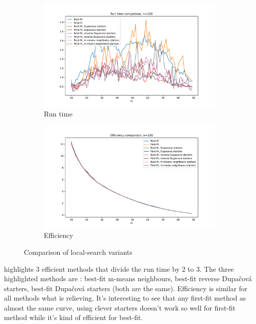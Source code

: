 \documentclass{amsart}
\begin{document}
\begin{figure}[ht]
    \centering
    \begin{subfigure}[b]{0.495\textwidth}
        \centering
        \includegraphics[width=1.1\textwidth]{plots/run time methods.pdf}
        \caption{Run time}
    \end{subfigure}
    \hfill
    \begin{subfigure}[b]{0.495\textwidth}
        \centering
        \includegraphics[width=1.1\textwidth]{plots/value methods.pdf}
        \caption{Efficiency}
    \end{subfigure}
    \caption{Comparison of local-search variants}
    \label{methods}
\end{figure}

 highlights 3 efficient methods that divide the run time by 2 to 3. The three highlighted methods are : best-fit m-means neighbours, best-fit reverse Dupačová starters, best-fit Dupačová starters (both are the same). Efficiency is similar for all methods what is relieving. It's interesting to see that any first-fit method as almost the same curve, using clever starters doesn't work so well for first-fit method while it's kind of efficient for best-fit.
\end{document}
